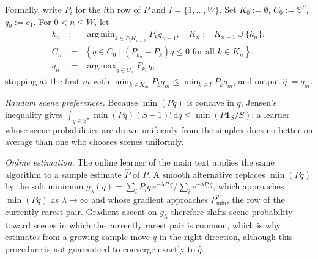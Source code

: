 \documentclass[a4paper,natbib,man]{apa6}
\newcommand{\one}[1]{\mathbf{1}_{#1}}
\newcommand{\Simplex}[1]{\mathbb{S}^{#1}}
\newcommand{\dd}[0]{\text{d}}
\DeclareMathOperator*{\argmin}{arg\,min}
\DeclareMathOperator*{\argmax}{arg\,max}
\begin{document}
Formally, write $P_i$ for the $i$th row of $P$ and $I = \{1, \ldots, W\}$. Set $K_{0} := \emptyset$, $C_{0} := \Simplex{S}$, $q_{0} := e_{1}$. For $0 < n \le W$, let
\begin{eqnarray}
\nonumber
k_{n} &:=& \argmin_{k \in I \setminus K_{n-1}} P_{k} q_{n-1},\quad K_{n} := K_{n-1} \cup \{k_n\},
\\
\nonumber
C_{n} &:=& \left\{q \in C_{0} \mid (P_{k_{n}} - P_{k})q\le 0 \text{ for all } k \in K_{n} \right\},
\\
\nonumber
q_{n} &:=& \argmax_{q \in C_{n}} P_{k_n}q,
\end{eqnarray}
stopping at the first $m$ with $\min_{k \in K_{m}} P_{k} q_{m} \le \min_{k \in I } P_{k} q_{m}$, and output $\hat q := q_{m}$.

\textit{Random scene preferences.} Because $\min(Pq)$ is concave in $q$, Jensen's inequality gives $\int_{q\in \Simplex{S}}\min( Pq ) (S-1)!\,\dd q \le \min( P \one{S}/S )$: a learner whose scene probabilities are drawn uniformly from the simplex does no better on average than one who chooses scenes uniformly.

\textit{Online estimation.} The online learner of the main text applies the same algorithm to a sample estimate $\hat P$ of $P$. A smooth alternative replaces $\min(Pq)$ by the soft minimum $g_\lambda(q) = \sum_i P_i q\, e^{-\lambda P_i q} / \sum_i e^{-\lambda P_i q}$, which approaches $\min(Pq)$ as $\lambda \to \infty$ and whose gradient approaches $P_{\min}^T$, the row of the currently rarest pair. Gradient ascent on $g_\lambda$ therefore shifts scene probability toward scenes in which the currently rarest pair is common, which is why estimates from a growing sample move $q$ in the right direction, although this procedure is not guaranteed to converge exactly to $\hat q$.
\end{document}
